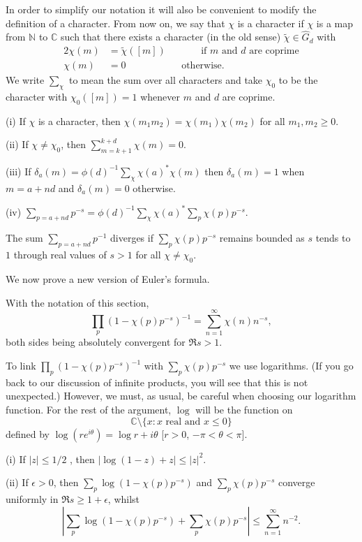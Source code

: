 In order to simplify our notation it will also be convenient
to modify the definition of a character. From now on, we say
that $\chi$ is a character if $\chi$ is a map from
${\mathbb N}$ to ${\mathbb C}$ such that there exists a character
(in the old sense) $\tilde{\chi}\in \hat{G}_{d}$
with
\begin{alignat*}{2}
\chi(m)&=\tilde{\chi}([m])&&\qquad\text{if $m$ and $d$ are coprime}\\
\chi(m)&=0&&\text{otherwise}.
\end{alignat*}
We write $\sum_{\chi}$ to mean the sum over all characters
and take $\chi_{0}$ to be the character with
$\chi_{0}([m])=1$ whenever $m$ and $d$ are coprime.

\begin{lemma} (i) If $\chi$ is a character, then
$\chi(m_{1}m_{2})=\chi(m_{1})\chi(m_{2})$
for all $m_{1},m_{2}\geq 0$.

(ii) If $\chi\neq\chi_{0}$, then
$\sum_{m=k+1}^{k+d}\chi(m)=0$.

(iii) If $\delta_{a}(m)=\phi(d)^{-1}\sum_{\chi}\chi(a)^{*}\chi(m)$
then $\delta_{a}(m)=1$ when $m=a+nd$ and $\delta_{a}(m)=0$
otherwise.

(iv) $\displaystyle{\sum_{p=a+nd}p^{-s}
=\phi(d)^{-1}\sum_{\chi}\chi(a)^{*}\sum_{p}\chi(p)p^{-s}}$.
\end{lemma}
\begin{lemma} The sum $\sum_{p=a+nd}p^{-1}$ diverges if
$\sum_{p}\chi(p)p^{-s}$ remains bounded
as $s$ tends to $1$ through real values of $s>1$
for all $\chi\neq\chi_{0}$.
\end{lemma}

We now prove a new version of Euler's formula.
\begin{theorem}
With the notation of this section,
\[\prod_{p}(1-\chi(p)p^{-s})^{-1}=
\sum_{n=1}^{\infty}\chi(n)n^{-s},\]
both sides being absolutely convergent for $\Re s>1$.
\end{theorem}
To link $\prod_{p}(1-\chi(p)p^{-s})^{-1}$
with $\sum_{p}\chi(p)p^{-s}$ we use logarithms.
(If you go back to our discussion of infinite products,
you will see that this is not unexpected.) However,
we must, as usual, be careful when choosing our logarithm
function. For the rest of the argument, $\log$
will be the function on
\[{\mathbb C}\setminus\{x:\text{$x$ real and $x\leq 0$}\}\]
defined by $\log (re^{i\theta})=\log r+i\theta$
[$r>0$, $-\pi<\theta<\pi$].
\begin{lemma} (i) If $|z|\leq 1/2$ , then $|\log(1-z)+z|\leq |z|^{2}$.

(ii) If $\epsilon>0$, then $\sum_{p}\log(1-\chi(p)p^{-s})$
and $\sum_{p}\chi(p)p^{-s}$ converge uniformly in
$\Re s\geq 1+\epsilon$, whilst
\[\left|\sum_{p}\log(1-\chi(p)p^{-s})+\sum_{p}\chi(p)p^{-s}\right|
\leq \sum_{n=1}^{\infty}n^{-2}.\]
\end{lemma}

